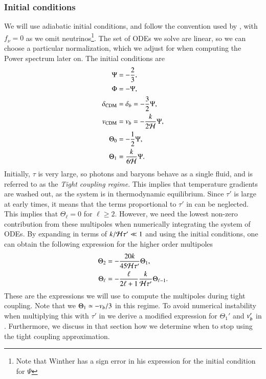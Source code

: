 \subsubsection{Initial conditions} \label{sssec:M3:theory:initial_conditions}
We will use adiabatic initial conditions, and follow the convention used by \cite{winther}, with $f_\nu=0$ as we omit neutrinos\footnote{Note that Winther has a sign error in his expression for the initial condition for $\Psi$}. The set of ODEs we solve are linear, so we can choose a particular normalization, which we adjust for when computing the Power spectrum later on. The initial conditions are      
\begin{subequations} \label{eq:M3:theory:pert_ODE_IC}
    \begin{align}
        \Psi &= -\frac{2}{3}, \label{eq:M3:theory:pert_ODE_IC_Psi} \\
        \Phi &= - \Psi, \label{eq:M3:theory:pert_ODE_IC_Phi} \\
        \delta_\mathrm{CDM} &= \delta_b = -\frac{3}{2}\Psi, \label{eq:M3:theory:pert_ODE_IC_delta_cdm} \\
        v_\mathrm{CDM} &= v_b = -\frac{k}{2\mathcal{H}} \Psi, \label{eq:M3:theory:pert_ODE_IC_v_cdm} \\
        \Theta_0 &= -\frac{1}{2}\Psi, \label{eq:M3:theory:pert_ODE_IC_Theta0} \\
        \Theta_1 &= \frac{k}{6\mathcal{H}}\Psi. \label{eq:M3:theory:pert_ODE_IC_Theta1} 
    \end{align}
\end{subequations}
Initially, $\tau$ is very large, so photons and baryons behave as a single fluid, and is referred to as the \textit{Tight coupling regime}. This implies that temperature gradients are washed out, as the system is in thermodynamic equilibrium. Since $\tau'$ is large at early times, it means that the terms proportional to $\tau'$ in  can be neglected. This implies that $\Theta_\ell=0$ for $\ell\geq2$. However, we need the lowest non-zero contribution from these multipoles when numerically integrating the system of ODEs. By expanding in terms of $k/\mathcal{H}\tau'\ll1$ and using the initial conditions, one can obtain the following expression for the higher order multipoles
\begin{subequations} \label{eq:M3:theory:IC_Thetas}
    \begin{align}
        \Theta_2 &= - \frac{20k}{45\mathcal{H}\tau'}\Theta_1, \label{eq:M3:theory:IC_Theta2} \\
        \Theta_\ell &= - \frac{\ell}{2\ell+1} \frac{k}{\mathcal{H}\tau'}\Theta_{\ell-1} \label{eq:M3:theory:IC_Theta_ell}. 
    \end{align}
\end{subequations}
These are the expressions we will use to compute the multipoles during tight coupling. Note that we $\Theta_1\simeq-v_b/3$ in this regime. To avoid numerical instability when multiplying this with $\tau'$ in  we derive a modified expression for $\Theta_1'$ and $v_b'$ in . Furthermore, we discuss in that section how we determine when to stop using the tight coupling approximation. 

